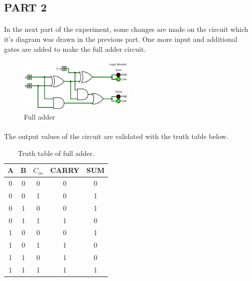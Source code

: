 \documentclass[pdftex,12pt,a4paper]{article}
\begin{document}
\begin{flushleft}
\subsection{PART 2}
    \paragraph{}
    In the next part of the experiment, some changes are made on the circuit which it's diagram was drawn in the previous part. One more input and additional gates are added to make the full adder circuit.
    
     \begin{figure}[h]
    	\centering
    	\includegraphics[width=0.5\textwidth]{part2.png}	
    	\caption{Full adder}
    	\label{fig:full_adder}
    \end{figure}
   
    \paragraph{}
    The output values of the circuit are validated with the truth table below.
    
\begin{table}[!h]
\begin{center}
    \begin{tabular}{|c|c|c|c|c|}
    \hline
    
        \hline
         A & B & $C_{in}$ & CARRY & SUM \\
         \hline
         0 & 0 & 0 & 0 & 0 \\
         \hline
         0 & 0 & 1 & 0 & 1 \\
         \hline
         0 & 1 & 0 & 0 & 1 \\
         \hline
         0 & 1 & 1 & 1 & 0 \\
         \hline
         1 & 0 & 0 & 0 & 1 \\
         \hline
         1 & 0 & 1 & 1 & 0 \\
         \hline
         1 & 1 & 0 & 1 & 0 \\
         \hline   
         1 & 1 & 1 & 1 & 1 \\
         \hline         
    \end{tabular}
    \caption{Truth table of full adder.}
    \label{table_full}
\end{center}
\end{table}    


\end{flushleft}
\end{document}
